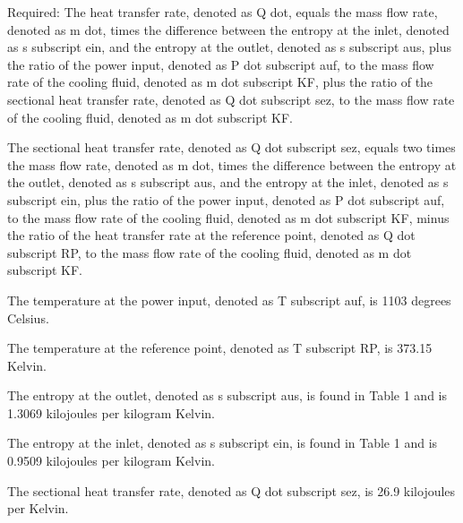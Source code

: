 Required: The heat transfer rate, denoted as Q dot, equals the mass flow rate, denoted as m dot, times the difference between the entropy at the inlet, denoted as s subscript ein, and the entropy at the outlet, denoted as s subscript aus, plus the ratio of the power input, denoted as P dot subscript auf, to the mass flow rate of the cooling fluid, denoted as m dot subscript KF, plus the ratio of the sectional heat transfer rate, denoted as Q dot subscript sez, to the mass flow rate of the cooling fluid, denoted as m dot subscript KF.

The sectional heat transfer rate, denoted as Q dot subscript sez, equals two times the mass flow rate, denoted as m dot, times the difference between the entropy at the outlet, denoted as s subscript aus, and the entropy at the inlet, denoted as s subscript ein, plus the ratio of the power input, denoted as P dot subscript auf, to the mass flow rate of the cooling fluid, denoted as m dot subscript KF, minus the ratio of the heat transfer rate at the reference point, denoted as Q dot subscript RP, to the mass flow rate of the cooling fluid, denoted as m dot subscript KF.

The temperature at the power input, denoted as T subscript auf, is 1103 degrees Celsius.

The temperature at the reference point, denoted as T subscript RP, is 373.15 Kelvin.

The entropy at the outlet, denoted as s subscript aus, is found in Table 1 and is 1.3069 kilojoules per kilogram Kelvin.

The entropy at the inlet, denoted as s subscript ein, is found in Table 1 and is 0.9509 kilojoules per kilogram Kelvin.

The sectional heat transfer rate, denoted as Q dot subscript sez, is 26.9 kilojoules per Kelvin.